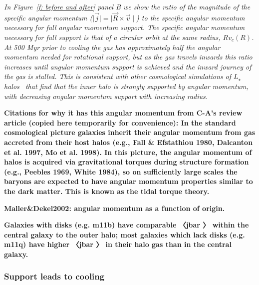 \documentclass[fleqn,usenatbib]{mnras}
\begin{document}
\textit{
In Figure~\ref{f: before and after} panel B we show the ratio of the magnitude of the specific angular momentum ($\mid \vec j \mid = \mid \vec R \times \vec v \mid$) to the specific angular momentum necessary for full angular momentum support.
The specific angular momentum necessary for full support is that of a circular orbit at the same radius, $R v_c(R)$.
At 500 Myr prior to cooling the gas has approximately half the angular momentum needed for rotational support, but as the gas travels inwards this ratio increases until angular momentum support is achieved and the inward journey of the gas is stalled.
This is consistent with other cosmological simulations of $L_\star$ halos~\citep[e.g.][]{Oppenheimer2018} that find that the inner halo is strongly supported by angular momentum, with decreasing angular momentum support with increasing radius.
}

\textbf{Citations for why it has this angular momentum from C-A's review article (copied here temporarily for convenience):
In the standard cosmological picture galaxies inherit their angular momentum from gas accreted from their host halos (e.g., Fall \& Efstathiou 1980, Dalcanton et al. 1997, Mo et al. 1998). In this picture, the angular momentum of halos is acquired via gravitational torques during structure formation (e.g., Peebles 1969, White 1984), so on sufficiently large scales the baryons are expected to have angular momentum properties similar to the dark matter. This is known as the tidal torque theory.}

\textbf{Maller\&Dekel2002: angular momentum as a function of origin.}

\textbf{
\cite{el-badryGasKinematicsMorphology2018}
Galaxies with disks (e.g. m11b) have comparable 〈jbar 〉 within the central galaxy to the outer halo; most galaxies which lack disks (e.g. m11q) have higher 〈jbar 〉 in their halo gas than in the central galaxy.
}

\subsubsection{Support leads to cooling}
\end{document}
